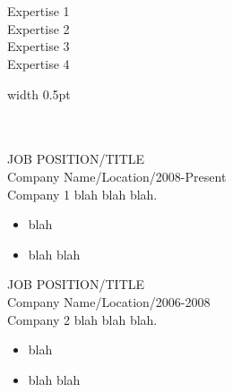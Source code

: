 \documentclass[12pt, a4paper, conference]{IEEEtran}
\newcommand{\borderthickness}{0.5pt}
\begin{document}
\begin{minipage}[t][6cm][t]{0.38\textwidth}
{}\\
\\
\hspace*{0pt}\hfill
Expertise 1\\

\hspace*{0pt}\hfill
Expertise 2\\

\hspace*{0pt}\hfill
Expertise 3\\

\hspace*{0pt}\hfill
Expertise 4\\

\end{minipage}
\quad
\textcolor{bordercolour}{\vrule height 4ex width \borderthickness}
\quad
\begin{minipage}[t][5cm][t]{0.52\textwidth}
{}\\
\\

JOB POSITION/TITLE\\
Company Name/Location/2008-Present\\
Company 1 blah blah blah.
\begin{itemize}
\item blah
\item blah blah\\
\end{itemize}

JOB POSITION/TITLE\\
Company Name/Location/2006-2008\\
Company 2 blah blah blah.
\begin{itemize}
\item blah
\item blah blah
\end{itemize}

\end{minipage}
\end{document}
